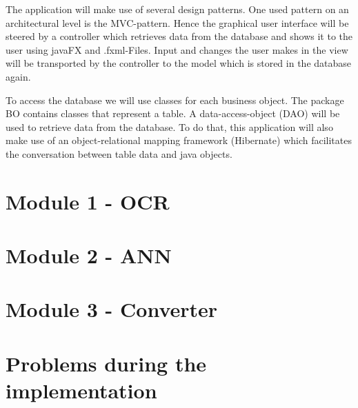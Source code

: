 The application will make use of several design patterns. One used pattern on an architectural level is the MVC-pattern. Hence the graphical user interface will be steered by a controller which retrieves data from the database and shows it to the user using javaFX and .fxml-Files. Input and changes the user makes in the view will be transported by the controller to the model which is stored in the database again.

To access the database we will use classes for each business object. The package BO contains classes that represent a table. A data-access-object (DAO) will be used to retrieve data from the database. To do that, this application will also make use of an object-relational mapping framework (Hibernate) which facilitates the conversation between table data and java objects.

\section{Module 1 - OCR}

\section{Module 2 - ANN}

\section{Module 3 - Converter}

\section{Problems during the implementation}